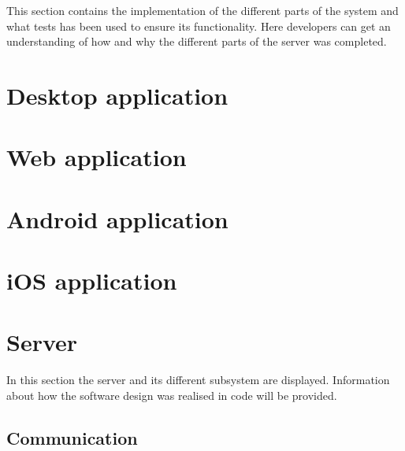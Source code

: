 
This section contains the implementation of the different parts of the system and what tests has been used to ensure its functionality. Here developers can get an understanding of how and why the different parts of the server was completed.



\section{Desktop application}

\FloatBarrier

\section{Web application}

\FloatBarrier

\section{Android application}

\FloatBarrier

\section{iOS application}

\FloatBarrier

\section{Server}

In this section the server and its different subsystem are displayed.
Information about how the software design was realised in code will be provided.

\subsection{Communication}

\FloatBarrier

